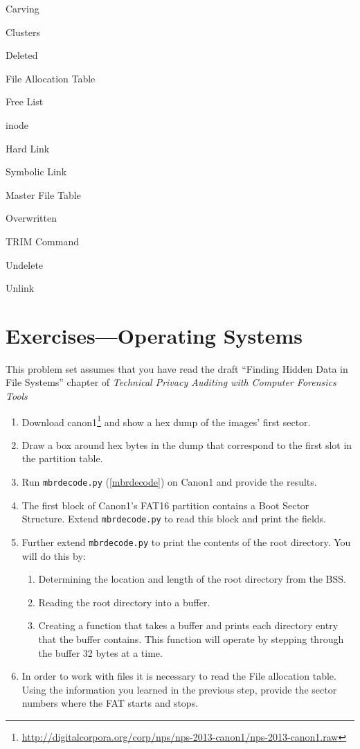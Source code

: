 Carving

Clusters

Deleted

File Allocation Table

Free List

inode

Hard Link

Symbolic Link

Master File Table

Overwritten

TRIM Command

Undelete

Unlink

\section{Exercises---Operating Systems}
This problem set assumes that you have read the draft ``Finding Hidden Data
in File Systems'' chapter of \emph{Technical Privacy Auditing with
  Computer Forensics Tools}

\begin{enumerate}
\item Download canon1\footnote{\url{http://digitalcorpora.org/corp/nps/nps-2013-canon1/nps-2013-canon1.raw}} and show a hex dump of the
  images' first sector.
\item Draw a box around hex bytes in the dump that
  correspond to the first slot in the partition table.
\item Run \texttt{mbrdecode.py} (\ref{mbrdecode}) on Canon1 and provide the results.
\item The first block of Canon1's FAT16 partition contains a Boot
  Sector Structure. Extend \texttt{mbrdecode.py} to read this block
  and print the fields. 
\item Further extend \texttt{mbrdecode.py} to print the contents of the root
  directory.  You will do this by:
\begin{enumerate}
  \item Determining the location and length of the root directory
    from the BSS.
  \item Reading the root directory into a buffer.
  \item Creating a function that takes a buffer and prints each
    directory entry that the buffer contains.  This function will
    operate by stepping through the buffer 32 bytes at a time.
\end{enumerate}  

\item In order to work with files it is necessary to read the File
  allocation table. Using the information you learned in the previous
  step, provide the sector numbers where the FAT starts and stops.
\end{enumerate}


